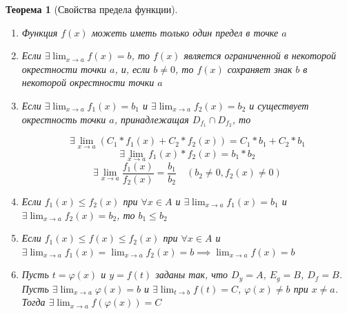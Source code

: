 \documentclass[a4paper,oneside]{article}
\newcommand{\dslim}{\displaystyle\lim}
\newtheorem{theorem}{Теорема}[subsection]
\theoremstyle{definition}
\theoremstyle{definition}
\theoremstyle{definition}
\begin{document}
\begin{theorem}[Свойства предела функции]
    \begin{enumerate}
        \item Функция $f(x)$ можеть иметь только один предел в точке $a$
        \item 
            Если $\exists \dslim_{x \to a} f(x) = b$, то $f(x)$ является 
            ограниченной в некоторой окрестности точки $a$, и, если $b \ne 0$, 
            то $f(x)$ сохраняет знак $b$ в некоторой окрестности точки $a$

        \item 
            Если $\exists \dslim_{x \to a} f_1 (x) = b_1$ и 
            $\exists \dslim_{x \to a} f_2 (x) = b_2$ и 
            существует окрестность точки $a$, принадлежащая $D_{f_1} \cap D_{f_2}$, то 

            \[ \exists \dslim_{x \to a} (C_1 * f_1(x) + C_2* f_2(x)) = C_1 * b_1 + C_2 * b_1 \]
            \[ \exists \dslim_{x \to a} f_1(x) * f_2(x) = b_1 * b_2 \]
            \[ \exists \dslim_{x \to a} \frac{f_1(x)}{f_2(x)} = \frac{b_1}{b_2} \quad (b_2 \ne 0, f_2(x) \ne 0) \]

        \item 
            Если $f_1(x) \le f_2(x)$ при $\forall x \in A$ и 
            $\exists \dslim_{x \to a} f_1(x) = b_1$ и 
            $\exists \dslim_{x \to a} f_2(x) = b_2$, то $b_1 \le b_2$

        \item
            Если $f_1(x) \le f(x) \le f_2(x)$ при $\forall x \in A$ и
            $\exists \dslim_{x \to a} f_1(x) = \dslim_{x \to a} f_2(x) = b \implies \dslim_{x \to a} f(x) = b$

        \item 
            Пусть $t =  \varphi(x)$ и $y = f(t)$ заданы так, что $D_y = A$, $E_g = B$, $D_f = B$. 
            Пусть $\exists \dslim_{x \to a}  \varphi(x) = b$ и $\exists \dslim_{t \to b} f(t) = C$, $ \varphi(x) \ne b$ при $x \ne a$.
            Тогда $\exists \dslim_{x \to a} f( \varphi(x)) = C$
    \end{enumerate}
\end{theorem}
\end{document}
